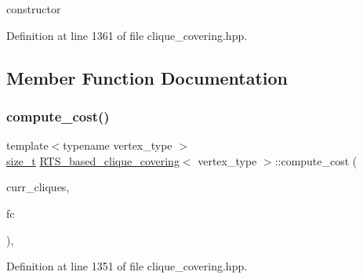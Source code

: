 constructor 



Definition at line 1361 of file clique\+\_\+covering.\+hpp.



\subsection{Member Function Documentation}
\mbox{\label{classRTS__based__clique__covering_aa3332cac0f1be5a924e163ed8bc601c3}} 
\subsubsection{\texorpdfstring{compute\+\_\+cost()}{compute\_cost()}}
{\footnotesize\ttfamily template$<$typename vertex\+\_\+type $>$ \\
\hyperlink{tutorial__fpt__2017_2intro_2sixth_2test_8c_a7c94ea6f8948649f8d181ae55911eeaf}{size\+\_\+t} \hyperlink{classRTS__based__clique__covering}{R\+T\+S\+\_\+based\+\_\+clique\+\_\+covering}$<$ vertex\+\_\+type $>$\+::compute\+\_\+cost (\begin{DoxyParamCaption}\item[{std\+::vector$<$ \hyperlink{classCustomOrderedSet}{Custom\+Ordered\+Set}$<$ \hyperlink{clique__covering__graph_8hpp_a9cb45047ea8c5ed95a8cfa90494345aa}{C\+\_\+vertex} $>$$>$ \&}]{curr\+\_\+cliques,  }\item[{const \hyperlink{structfilter__clique}{filter\+\_\+clique}$<$ vertex\+\_\+type $>$ \&}]{fc }\end{DoxyParamCaption})\hspace{0.3cm}{\ttfamily [inline]}, {\ttfamily [private]}}



Definition at line 1351 of file clique\+\_\+covering.\+hpp.

\mbox{\label{classRTS__based__clique__covering_a8420447a440f2eb93a4c2f2eb42fac14}} 
